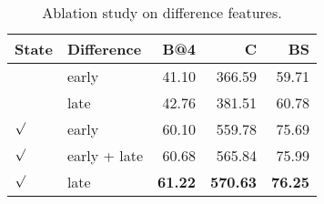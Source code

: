 \begin{table}[ht]
\centering
\small
\caption{Ablation study on difference features.}
\label{tab:diff}
\begin{tabular}{llrrr}
\toprule
State & Difference & B@4 & C & BS \\
\midrule
 & early & 41.10 & 366.59 & 59.71 \\
 & late & 42.76 & 381.51 & 60.78 \\
$\surd$ & early & 60.10 & 559.78 & 75.69 \\
$\surd$ & early + late & 60.68 & 565.84 & 75.99 \\
$\surd$ & late & \textbf{61.22} & \textbf{570.63} & \textbf{76.25} \\
\bottomrule
\end{tabular}
\end{table}
